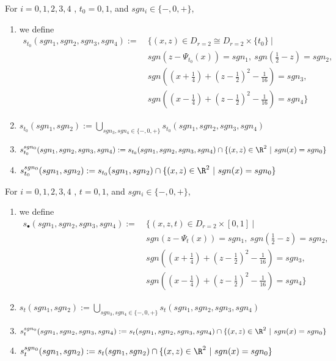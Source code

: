 \begin{definition}
For $i = 0,1,2,3,4$ , $t_0 = 0,1$, and $sgn_i \in \{-,0,+\}$,
\begin{enumerate}
\item we define
\begin{align*}
s_{t_0}(sgn_1,sgn_2,sgn_3,sgn_4):=~ &\{(x,z) \in D_{r=2}\cong D_{r=2}\times \{t_0\} ~| \\
&sgn(z-\Psi_{t_0}(x))=sgn_1,~ sgn(\frac{1}{2}-z)=sgn_2,\\ 
&sgn((x+\frac{1}{4})+(z-\frac{1}{2})^2 - \frac{1}{16})=sgn_3,\\
&sgn((x-\frac{1}{4})+(z-\frac{1}{2})^2 - \frac{1}{16})=sgn_4 \}
\end{align*}

\item $s_{t_0}(sgn_1,sgn_2) := \bigcup_{sgn_3,sgn_4 \in \{-,0,+\}}  s_{t_0}(sgn_1,sgn_2,sgn_3,sgn_4)$

\item $s_{t_0}^{sgn_0}(sgn_1,sgn_2,sgn_3,sgn_4) := s_{t_0}(sgn_1,sgn_2,sgn_3,sgn_4) \cap \{(x,z)\in \R^2 ~|~ sgn(x)=sgn_0 \}$

\item $s_{t_0}^{sgn_0}(sgn_1,sgn_2) := s_{t_0}(sgn_1,sgn_2) \cap \{(x,z)\in \R^2 ~|~ sgn(x)=sgn_0 \}$
\end{enumerate}
\end{definition}

\begin{definition}
For $i = 0,1,2,3,4$ , $t=0,1$, and $sgn_i \in \{-,0,+\}$,
\begin{enumerate}
\item we define
\begin{align*}
s_\bullet(sgn_1,sgn_2,sgn_3,sgn_4):=~ &\{(x,z,t) \in D_{r=2}\times [0,1] ~|\\
&sgn(z-\Psi_t(x))=sgn_1,~ sgn(\frac{1}{2}-z)=sgn_2,\\ 
&sgn((x+\frac{1}{4})+(z-\frac{1}{2})^2 - \frac{1}{16})=sgn_3,\\
&sgn((x-\frac{1}{4})+(z-\frac{1}{2})^2 - \frac{1}{16})=sgn_4 \}
\end{align*}

\item $s_t(sgn_1,sgn_2) := \bigcup_{sgn_3,sgn_4 \in \{-,0,+\}} s_t(sgn_1,sgn_2,sgn_3,sgn_4)$

\item $s_t^{sgn_0}(sgn_1,sgn_2,sgn_3,sgn_4) := s_t(sgn_1,sgn_2,sgn_3,sgn_4) \cap \{(x,z)\in \R^2 ~|~ sgn(x)=sgn_0 \}$

\item $s_t^{sgn_0}(sgn_1,sgn_2) := s_t(sgn_1,sgn_2) \cap \{(x,z)\in \R^2 ~|~ sgn(x)=sgn_0 \}$
\end{enumerate}
\end{definition}


